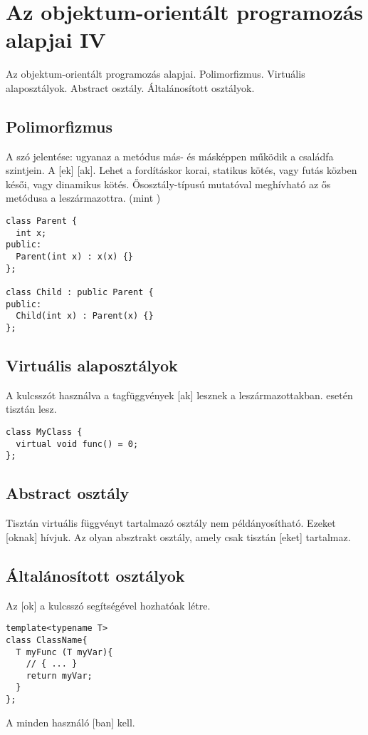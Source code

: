 \documentclass[../../main.tex]{subfiles}
\begin{document}
\section{Az objektum-orientált programozás alapjai IV}

\begin{fulltheorem}
  Az objektum-orientált programozás alapjai. Polimorfizmus. Virtuális
  alaposztályok. Abstract osztály. Általánosított osztályok.
\end{fulltheorem}

\subsection{Polimorfizmus}

A szó jelentése: ugyanaz a metódus más- és másképpen működik a családfa
szintjein. A [ek] [ak]. Lehet a
fordításkor korai, statikus kötés, vagy futás közben késői, vagy dinamikus
kötés. Ősosztály-típusú mutatóval meghívható az ős metódusa a
leszármazottra. (mint )

\begin{verbatim}
class Parent {
  int x;
public:
  Parent(int x) : x(x) {}
};

class Child : public Parent {
public:
  Child(int x) : Parent(x) {}
};
\end{verbatim}

\subsection{Virtuális alaposztályok}

A  kulcsszót használva a tagfüggvények [ak]
lesznek a leszármazottakban.  esetén tisztán  lesz.

\begin{verbatim}
class MyClass {
  virtual void func() = 0;
};
\end{verbatim}

\subsection{Abstract osztály}

Tisztán virtuális függvényt tartalmazó osztály nem példányosítható.
Ezeket [oknak] hívjuk. Az  olyan absztrakt
osztály, amely csak tisztán [eket] tartalmaz.

\subsection{Általánosított osztályok}

Az [ok] a  kulcsszó segítségével
hozhatóak létre.

\begin{verbatim}
template<typename T>
class ClassName{
  T myFunc (T myVar){
    // { ... }
    return myVar;
  }
};
\end{verbatim}

A  minden használó [ban] kell.
\end{document}

